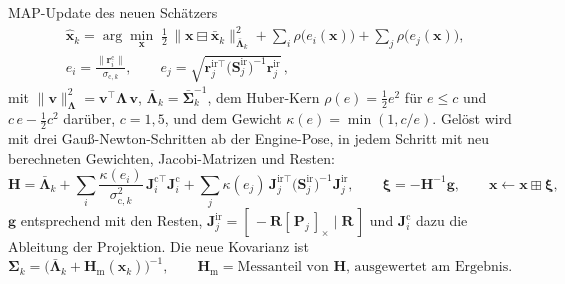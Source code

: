 \documentclass[11pt,a4paper,fleqn]{article}
\newcommand{\Sir}{\mathbf{S}^{\mathrm{ir}}_{j}}
\newcommand{\xb}{\bar{\mathbf{x}}_k}
\newcommand{\xh}{\hat{\mathbf{x}}}
\newcommand{\Sb}{\bar{\boldsymbol{\Sigma}}_k}
\newcommand{\Lb}{\bar{\boldsymbol{\Lambda}}_k}
\newcommand{\cross}[1]{[\,#1\,]_{\times}}
\begin{document}
\begin{mybox}{MAP-Update des neuen Schätzers}
\begin{equation}
  \begin{aligned}
  &\xh_k = \arg\min_{\mathbf{x}}\;
  \tfrac12\,\bigl\lVert \mathbf{x} \boxminus \xb \bigr\rVert^2_{\Lb}
  + \sum_i \rho\bigl(e_i(\mathbf{x})\bigr)
  + \sum_j \rho\bigl(e_j(\mathbf{x})\bigr),\\
  &e_i = \frac{\lVert \mathbf{r}^{\mathrm{c}}_i \rVert}{\sigma_{\mathrm{c},k}}, \qquad
  e_j = \sqrt{\mathbf{r}^{\mathrm{ir}\top}_j \bigl(\Sir\bigr)^{-1} \mathbf{r}^{\mathrm{ir}}_j}\,,
  \end{aligned}
  \label{eq:map}
\end{equation}
mit $\lVert\mathbf{v}\rVert^2_{\boldsymbol{\Lambda}} = \mathbf{v}^{\top}\boldsymbol{\Lambda}\,\mathbf{v}$,
$\Lb = \Sb^{-1}$, dem Huber-Kern $\rho(e) = \tfrac12 e^2$ für $e \le c$ und $c\,e - \tfrac12 c^2$ darüber,
$c = 1{,}5$, und dem Gewicht $\kappa(e) = \min(1, c/e)$. Gelöst wird mit drei Gauß-Newton-Schritten ab der
Engine-Pose, in jedem Schritt mit neu berechneten Gewichten, Jacobi-Matrizen und Resten:
\begin{equation}
  \mathbf{H} = \Lb + \sum_i \frac{\kappa(e_i)}{\sigma_{\mathrm{c},k}^2}\,\mathbf{J}^{\mathrm{c}\top}_i\mathbf{J}^{\mathrm{c}}_i
     + \sum_j \kappa(e_j)\,\mathbf{J}^{\mathrm{ir}\top}_j \bigl(\Sir\bigr)^{-1}\mathbf{J}^{\mathrm{ir}}_j ,
  \qquad
  \boldsymbol{\xi} = -\mathbf{H}^{-1}\mathbf{g}, \qquad \mathbf{x} \leftarrow \mathbf{x} \boxplus \boldsymbol{\xi},
  \label{eq:gn}
\end{equation}
$\mathbf{g}$ entsprechend mit den Resten, $\mathbf{J}^{\mathrm{ir}}_j = [\,-\mathbf{R}\cross{\mathbf{P}_j} \mid
\mathbf{R}\,]$ und $\mathbf{J}^{\mathrm{c}}_i$ dazu die Ableitung der Projektion. Die neue Kovarianz ist
\begin{equation}
  \boldsymbol{\Sigma}_k = \bigl(\Lb + \mathbf{H}_{\mathrm{m}}(\xh_k)\bigr)^{-1},
  \qquad \mathbf{H}_{\mathrm{m}} = \text{Messanteil von } \mathbf{H}\text{, ausgewertet am Ergebnis.}
  \label{eq:post}
\end{equation}
\end{mybox}
\end{document}
